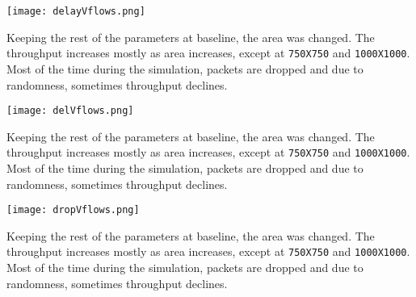 \documentclass{article}
\begin{document}
\begin{center}
    \texttt{[image: delayVflows.png]}
\end{center}

Keeping the rest of the parameters at baseline, the area was changed. The throughput increases mostly as area increases, except at \texttt{750X750} and \texttt{1000X1000}. Most of the time during the simulation, packets are dropped and due to randomness, sometimes throughput declines.

\begin{center}
    \texttt{[image: delVflows.png]}
\end{center}

Keeping the rest of the parameters at baseline, the area was changed. The throughput increases mostly as area increases, except at \texttt{750X750} and \texttt{1000X1000}. Most of the time during the simulation, packets are dropped and due to randomness, sometimes throughput declines.

\begin{center}
    \texttt{[image: dropVflows.png]}
\end{center}

Keeping the rest of the parameters at baseline, the area was changed. The throughput increases mostly as area increases, except at \texttt{750X750} and \texttt{1000X1000}. Most of the time during the simulation, packets are dropped and due to randomness, sometimes throughput declines.
\end{document}
